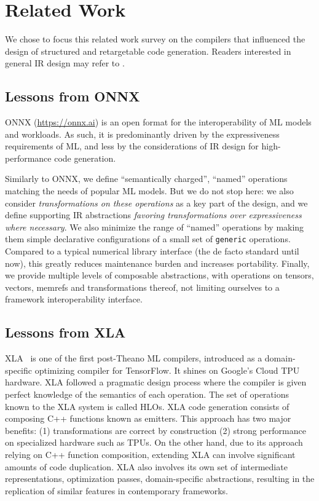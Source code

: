 \section{Related Work}

We chose to focus this related work survey on the compilers that influenced the design of structured and retargetable code generation. Readers interested in general IR design may refer to \cite{lattner2021mlir}.

\subsection{Lessons from ONNX}
ONNX (\url{https://onnx.ai}) is an open format for the interoperability of ML models and workloads.
As such, it is predominantly driven by the expressiveness requirements of ML, and less by the  considerations of IR design for high-performance code generation.

Similarly to ONNX, we define ``semantically charged'', ``named'' operations matching the needs of popular ML models.
But we do not stop here: we also consider \emph{transformations on these operations} as a key part of the design, and we define supporting IR abstractions \emph{favoring transformations over expressiveness where necessary}.
We also minimize the range of ``named'' operations by making them simple declarative configurations of a small set of \lstinline|generic| operations. Compared to a typical numerical library interface (the de facto standard until now), this greatly reduces maintenance burden and increases portability.
Finally, we provide multiple levels of composable abstractions, with operations on tensors, vectors, memrefs and transformations thereof, not limiting ourselves to a framework interoperability interface.

\subsection{Lessons from XLA}
XLA~\cite{XLA} is one of the first post-Theano ML compilers, introduced as a domain-specific optimizing compiler for TensorFlow. It shines on Google's Cloud TPU hardware. XLA followed a pragmatic design process where the compiler is given perfect knowledge of the semantics of each operation. The set of operations known to the XLA system is called HLOs. 
XLA code generation consists of composing C++ functions known as emitters. 
This approach has two major benefits:
(1) transformations are correct by construction
(2) strong performance on specialized hardware such as TPUs.
On the other hand, due to its approach relying on C++ function composition, extending XLA can involve significant amounts of code duplication. XLA also involves its own set of intermediate representations, optimization passes, domain-specific abstractions, resulting in the replication of similar features in contemporary frameworks.

